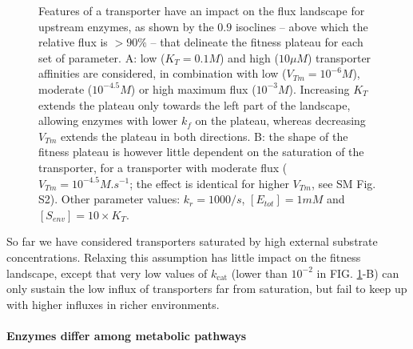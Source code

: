 \begin{figure}[h!]
\caption{Features of a transporter have an impact on the flux landscape for upstream enzymes, as shown by the $0.9$ isoclines -- above which the relative flux is $>90\%$ -- that delineate the fitness plateau for each set of parameter. A: low ($K_T=0.1M$) and high ($10\mu M$) transporter affinities are considered, in combination with low ($V_{Tm}=10^{-6} M$), moderate ($10^{-4.5} M$) or high maximum flux ($10^{-3} M$). Increasing $K_T$ extends the plateau only towards the left part of the landscape, allowing enzymes with lower $k_f$ on the plateau, whereas decreasing $V_{Tm}$ extends the plateau in both directions. B: the shape of the fitness plateau is however little dependent on the saturation of the transporter, for a transporter with moderate flux ($V_{Tm}=10^{-4.5}M.s^{-1}$; the effect is identical for higher $V_{Tm}$, see SM Fig. S2). Other parameter values: $k_r=1000/s$, $[E_{tot}]=1mM$ and $[S_{env}]=10 \times K_T$.}
\label{figure2DSSatStud}
\end{figure}

So far we have considered transporters saturated by high external substrate concentrations. Relaxing this assumption has little impact on the fitness landscape, except that very low values of $k_\text{cat}$ (lower than $10^{-2}$ in FIG. \ref{figure2DSSatStud}-B) can only sustain the low influx of transporters far from saturation, but fail to keep up with higher influxes in richer environments. 

\noindent \paragraph{Enzymes differ among metabolic pathways}

